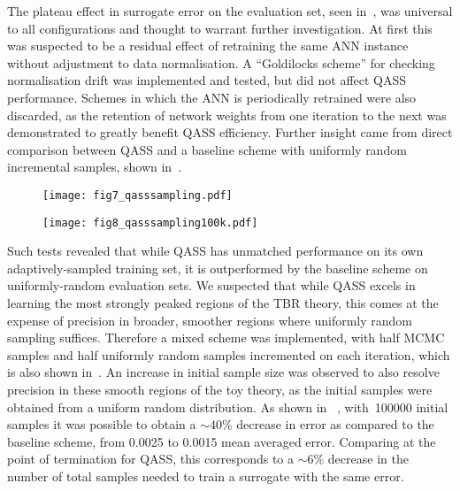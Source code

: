 The plateau effect in surrogate error on the evaluation set, seen
in~, was universal to all configurations and thought to
warrant further investigation. At first this was suspected to be a residual
effect of retraining the same ANN instance without adjustment to data
normalisation. A ``Goldilocks scheme'' for checking normalisation drift was
implemented and tested, but did not affect QASS performance. Schemes in which
the ANN is periodically retrained were also discarded, as the retention of
network weights from one iteration to the next was demonstrated to greatly
benefit QASS efficiency. Further insight came from direct comparison between
QASS and a baseline scheme with uniformly random incremental samples, shown
in~.

\begin{figure}[h]
\centering
\begin{minipage}{.48\textwidth}
  \texttt{[image: fig7\_qasssampling.pdf]}
\end{minipage}%
\hfill%
\begin{minipage}{.48\textwidth}
  \texttt{[image: fig8\_qasssampling100k.pdf]}
\end{minipage}
\end{figure}

Such tests revealed that while QASS has unmatched performance on its own
adaptively-sampled training set, it is outperformed by the baseline scheme on
uniformly-random evaluation sets. We suspected that while QASS excels in
learning the most strongly peaked regions of the TBR theory, this comes at the
expense of precision in broader, smoother regions where uniformly random
sampling suffices. Therefore a mixed scheme was implemented, with half MCMC
samples and half uniformly random samples incremented on each iteration, which
is also shown in~. An increase in initial sample size was
observed to also resolve precision in these smooth regions of the toy theory, as
the initial samples were obtained from a uniform random distribution. As shown
in ~, with~\num{100000} initial samples it was possible to obtain a ${\sim}40\%$ decrease in error as compared to the baseline scheme, from 0.0025 to 0.0015 mean averaged error. Comparing at the point of termination for QASS, this corresponds to a ${\sim}6\%$ decrease in the number of total samples needed to train a surrogate with the same error. 


